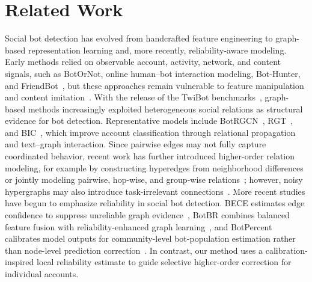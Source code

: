 \section{Related Work}\label{sec:related}

Social bot detection has evolved from handcrafted feature engineering to graph-based representation learning and, more recently, reliability-aware modeling. Early methods relied on observable account, activity, network, and content signals, such as BotOrNot, online human--bot interaction modeling, Bot-Hunter, and FriendBot~\cite{davis2016botornot,varol2017online,bot_hunter2018,friendbot2020}, but these approaches remain vulnerable to feature manipulation and content imitation~\cite{cresci2017paradigm}. With the release of the TwiBot benchmarks~\cite{feng2021twibot20,twibot22benchmark}, graph-based methods increasingly exploited heterogeneous social relations as structural evidence for bot detection. Representative models include BotRGCN~\cite{feng2021botrgcn}, RGT~\cite{feng2022rgt}, and BIC~\cite{lei2023bic}, which improve account classification through relational propagation and text--graph interaction. Since pairwise edges may not fully capture coordinated behavior, recent work has further introduced higher-order relation modeling, for example by constructing hyperedges from neighborhood differences~\cite{shi2024hypergraphbot} or jointly modeling pairwise, hop-wise, and group-wise relations~\cite{gao2025higherorder}; however, noisy hypergraphs may also introduce task-irrelevant connections~\cite{cai2022hypergraphstructure}. More recent studies have begun to emphasize reliability in social bot detection. BECE estimates edge confidence to suppress unreliable graph evidence~\cite{qiao2025bece}, BotBR combines balanced feature fusion with reliability-enhanced graph learning~\cite{lin2025botbr}, and BotPercent calibrates model outputs for community-level bot-population estimation rather than node-level prediction correction~\cite{tan2023botpercent}. In contrast, our method uses a calibration-inspired local reliability estimate to guide selective higher-order correction for individual accounts.
